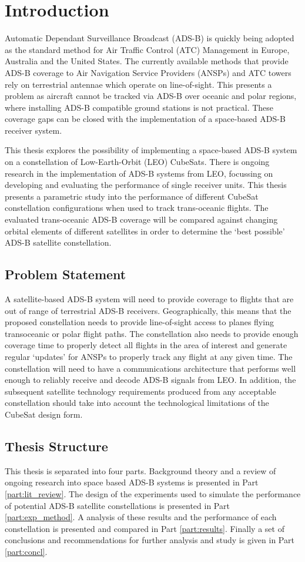 \section{Introduction}
Automatic Dependant Surveillance Broadcast (ADS-B) is quickly being adopted as the standard method for Air Traffic Control (ATC) Management in Europe, Australia and the United States. The currently available methods that provide ADS-B coverage to Air Navigation Service Providers (ANSPs) and ATC towers rely on terrestrial antennae which operate on line-of-sight. This presents a problem as aircraft cannot be tracked via ADS-B over oceanic and polar regions, where installing ADS-B compatible ground stations is not practical.  These coverage gaps can be closed with the implementation of a space-based ADS-B receiver system.

This thesis explores the possibility of implementing a space-based ADS-B system on a constellation of Low-Earth-Orbit (LEO) CubeSats. There is ongoing research in the implementation of ADS-B systems from LEO, focussing on developing and evaluating the performance of single receiver units. This thesis presents a parametric study into the performance of different CubeSat constellation configurations when used to track trans-oceanic flights. The evaluated trans-oceanic ADS-B coverage will be compared against changing orbital elements of different satellites in order to determine the `best possible' ADS-B satellite constellation. 

\subsection{Problem Statement}
A satellite-based ADS-B system will need to provide coverage to flights that are out of range of terrestrial ADS-B receivers. Geographically, this means that the proposed constellation needs to provide line-of-sight access to planes flying transoceanic or polar flight paths. The constellation also needs to provide enough coverage time to properly detect all flights in the area of interest and generate regular `updates' for ANSPs to properly track any flight at any given time. The constellation will need to have a communications architecture that performs well enough to reliably receive and decode ADS-B signals from LEO. In addition, the subsequent satellite technology requirements produced from any acceptable constellation should take into account the technological limitations of the CubeSat design form.

\subsection{Thesis Structure}
This thesis is separated into four parts. Background theory and a review of ongoing research into space based ADS-B systems is presented in Part \ref{part:lit_review}. The design of the experiments used to simulate the performance of potential ADS-B satellite constellations is presented in Part \ref{part:exp_method}. A analysis of these results and the performance of each constellation is presented and compared in Part \ref{part:results}. Finally a set of conclusions and recommendations for further analysis and study is given in Part \ref{part:concl}.